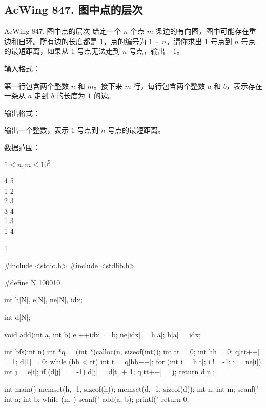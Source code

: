 \subsection{AcWing 847. 图中点的层次}
\begin{titledbox}{AcWing 847. 图中点的层次}
    给定一个 $n$ 个点 $m$ 条边的有向图，图中可能存在重边和自环。所有边的长度都是 $1$，点的编号为 $1 \sim n$。请你求出 $1$ 号点到 $n$ 号点的最短距离，如果从 $1$ 号点无法走到 $n$ 号点，输出 $-1$。

    输入格式：

    第一行包含两个整数 $n$ 和 $m$。接下来 $m$ 行，每行包含两个整数 $a$ 和 $b$，表示存在一条从 $a$ 走到 $b$ 的长度为 $1$ 的边。

    输出格式：

    输出一个整数，表示 $1$ 号点到 $n$ 号点的最短距离。

    数据范围：

    $1 \le n,m \le 10^5$

    \begin{inputblock}
        4 5 \\
        1 2 \\
        2 3 \\
        3 4 \\
        1 3 \\
        1 4
    \end{inputblock}
    \begin{outputblock}
        1
    \end{outputblock}
\end{titledbox}

\begin{mycpptwocol}[图的BFS]
    #include <stdio.h>
    #include <stdlib.h>

    #define N 100010

    int h[N], e[N], ne[N], idx;

    int d[N];

    void add(int a, int b) {
        e[++idx] = b;
        ne[idx] = h[a];
        h[a] = idx;
    }

    int bfs(int n) {
        int *q = (int *)calloc(n, sizeof(int));
        int tt = 0;
        int hh = 0;
        q[tt++] = 1;
        d[1] = 0;
        while (hh < tt) {
            int t = q[hh++];
            for (int i = h[t]; i != -1; i = ne[i]) {
                int j = e[i];
                if (d[j] == -1) {
                    d[j] = d[t] + 1;
                    q[tt++] = j;
                }
            }
        }
        return d[n];
    }

    int main() {
        memset(h, -1, sizeof(h));
        memset(d, -1, sizeof(d));
        int n;
        int m;
        scanf("%
        int a;
        int b;
        while (m--) {
            scanf("%
            add(a, b);
        }
        printf("%
        return 0;
    }
\end{mycpptwocol}



